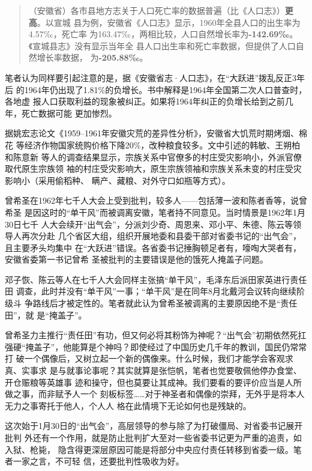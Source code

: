 {\begin{quotation}
  （安徽省）各市县地方志关于人口死亡率的数据普遍（比《人口志》）\textbf{更高}。以宣城
  县为例，安徽省《人口志》显示，1960年全县人口的出生率为4.57‰，死亡率
  为163.47‰，两相比较，人口自然增长率为\textbf{-142.69‰}。《宣城县志》没有显示当年全
  县人口出生率和死亡率数据，但提供了人口自然增长率数据，
  为\textbf{-205.88‰}。\cite{zaihuangchayixing}
\end{quotation}


笔者认为同样要引起注意的是，据《安徽省志·人口志》，在“大跃进”拨乱反正3年后
的1964年仍出现了1.81\%的负增长。书中解释是1964年全国第二次人口普查时，各地虚
报人口获取利益的现象被纠正。如果将1964年纠正的负增长给到之前几年，死亡数据可能
更加惨烈。

据姚宏志论文《1959--1961年安徽灾荒的差异性分析》，安徽省大饥荒时期烤烟、棉花
等经济作物国家统购价格下降20\%，改种粮食较多。文中引述的韩敏、王朔柏和陈意新
等人的调查结果显示，宗族关系中官僚多的村庄受灾影响小，外派官僚取代原生宗族领
袖的村庄受灾影响大，原生宗族领袖和宗族关系未变的村庄受灾影响小（采用偷稻种、
瞒产、藏粮、对外守口如瓶等方式）。

曾希圣在1962年七千人大会上受到批判，较多人——包括薄一波和陈者香等，说曾希圣
是因这时的“单干风”而被调离安徽，笔者持不同意见。当时情景是1962年1月30日七千
人大会续开“出气会”，分派刘少奇、周恩来、邓小平、朱德、陈云等领导人再次分赴
几个省区大组，组织开展地委和县委干部对省委书记的“出气会”，且主要矛头均集中
在“大跃进”错误。各省委书记捶胸顿足者有，嚎啕大哭者有，安徽省委第一书记曾希
圣被批判的主要错误是他的饿死人掩盖子问题。

邓子恢、陈云等人在七千人大会同样主张搞“单干风”，毛泽东后派田家英进行责任田
调查，此时并没有“单干风”一事；“单干风”是在同年8月北戴河会议转向继续阶级斗
争路线后才被定性的。笔者就此认为曾希圣被调离的主要原因绝不是“责任田”，就
是“掩盖子”。

曾希圣力主推行“责任田”有功，但又何必将其粉饰为神呢？“出气会”初期依然死扛
强硬“掩盖子”，他能算是个神吗？即使经过了中国历史几千年的教训，国民仍常常打
破一个偶像后，又树立起一个新的偶像来。什么时候，我们才能学会客观求真、实事求
是与就事论事呢？其实就算是张恺帆，笔者也觉要敬佩他停办食堂、开仓赈粮等英雄事
迹和操守，但也莫要让其成神。我们要看的要评价应当是人所做之事，而非赋予人一个
刻板标签……对于神圣者和偶像的崇拜，无外乎是将本人无力之事寄托于他人，个人人
格在此情境下无论如何也是残缺的。

这次始于1月30日的“出气会”，高层领导的参与除了为打破僵局、对省委书记展开批判
外还有一个作用，就是防止批判扩大至对一些省委书记更为严重的追责，如入狱、枪毙，
隐含得更深层原因可能是将部分中央应付责任转移到省委一级。笔者一家之言，不可轻
信，还要批判性吸收为好。

}
